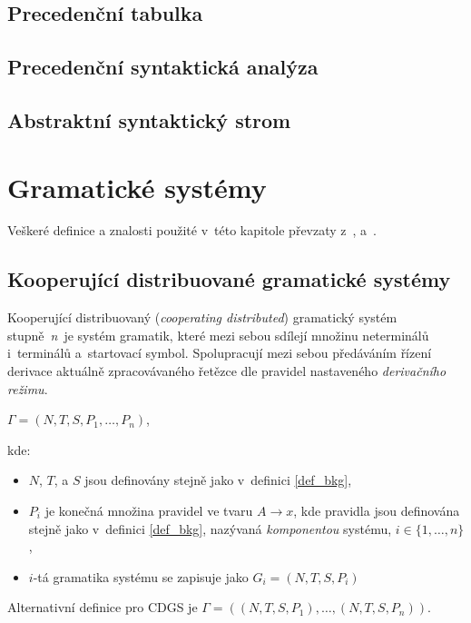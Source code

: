 \section{Precedenční tabulka}

\section{Precedenční syntaktická analýza}

\section{Abstraktní syntaktický strom}


\chapter{Gramatické systémy}\label{kap_GS}

Veškeré definice a znalosti použité v~této kapitole převzaty z~\cite{CDGS}, \cite{PCGS} a~\cite{Handbook-Of-Formal-Languages-2}.

\section{Kooperující distribuované gramatické systémy}

Kooperující distribuovaný (\emph{cooperating distributed}) gramatický systém stupně~\emph{n}~je systém gramatik, které mezi sebou sdílejí množinu neterminálů i~terminálů a~startovací symbol.
Spolupracují mezi sebou předáváním řízení derivace aktuálně zpracovávaného řetězce dle pravidel nastaveného \emph{derivačního režimu}.

\begin{definition}\label{def_cdgs}
\begin{center}
    $\Gamma = (N, T, S, P_1, \ldots ,P_n)$,
\end{center}
kde:
\begin{itemize}
    \item $N$, $T$, a $S$ jsou definovány stejně jako v~definici \ref{def_bkg},
    \item $P_i$ je konečná množina pravidel ve tvaru $A\rightarrow x$, kde pravidla jsou definována stejně jako v~definici \ref{def_bkg}, nazývaná \emph{komponentou} systému, $i \in \{1, \ldots, n\}$,
    \item $i$-tá gramatika systému se zapisuje jako $G_i = (N,T,S,P_i)$
\end{itemize}   
Alternativní definice pro CDGS je $\Gamma = ((N, T, S, P_1), \ldots , (N, T, S, P_n))$.
\end{definition}

